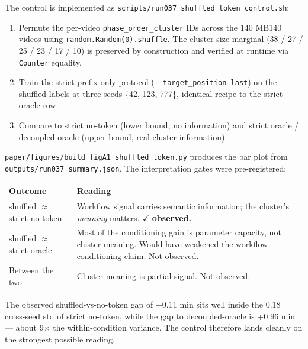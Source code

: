 The control is implemented as
\texttt{scripts/run037\_shuffled\_token\_control.sh}:

\begin{enumerate}
\def\labelenumi{\arabic{enumi}.}
\tightlist
\item
  Permute the per-video \texttt{phase\_order\_cluster} IDs across the
  140 MB140 videos using \texttt{random.Random(0).shuffle}. The
  cluster-size marginal (38 / 27 / 25 / 23 / 17 / 10) is preserved by
  construction and verified at runtime via \texttt{Counter} equality.
\item
  Train the strict prefix-only protocol
  (\texttt{-\/-target\_position\ last}) on the shuffled labels at three
  seeds \{42, 123, 777\}, identical recipe to the strict oracle row.
\item
  Compare to strict no-token (lower bound, no information) and strict
  oracle / decoupled-oracle (upper bound, real cluster information).
\end{enumerate}

\texttt{paper/figures/build\_figA1\_shuffled\_token.py} produces the bar
plot from \texttt{outputs/run037\_summary.json}. The interpretation
gates were pre-registered:

\begin{longtable}[]{@{}
  >{\raggedright\arraybackslash}p{}
  >{\raggedright\arraybackslash}p{}@{}}
\toprule\noalign{}
\begin{minipage}[b]{\linewidth}\raggedright
Outcome
\end{minipage} & \begin{minipage}[b]{\linewidth}\raggedright
Reading
\end{minipage} \\
\midrule\noalign{}
\endhead
\bottomrule\noalign{}
\endlastfoot
shuffled $\approx$ strict no-token & Workflow signal carries semantic
information; the cluster's \emph{meaning} matters. $\checkmark$
\textbf{observed.} \\
shuffled $\approx$ strict oracle & Most of the conditioning gain is parameter
capacity, not cluster meaning. Would have weakened the
workflow-conditioning claim. Not observed. \\
Between the two & Cluster meaning is partial signal. Not observed. \\
\end{longtable}

The observed shuffled-vs-no-token gap of +0.11 min sits well inside the
0.18 cross-seed std of strict no-token, while the gap to
decoupled-oracle is +0.96 min --- about 9$\times$ the within-condition
variance. The control therefore lands cleanly on the strongest possible
reading.

